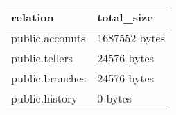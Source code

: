 \begin{tabular}{ll}
\rowcolor{heading}
\color{white}\textbf{relation} &
\color{white}\textbf{total\_size}\\
\hline

public.accounts & 1687552 bytes\\
public.tellers &  24576 bytes\\
public.branches & 24576 bytes\\
public.history & 0 bytes\\

\hline
\end{tabular}
